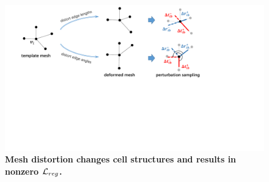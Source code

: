 \begin{figure}
    \centering
    \includegraphics[width=0.9\linewidth]{chapter3/tex/figures/active_model_axes_distortion.pdf}
    \caption{\small {\bf Mesh distortion changes cell structures and results in nonzero $\mathcal{L}_{reg}$.}
    }
    \label{ch3:fig:distort_coords}
\end{figure}